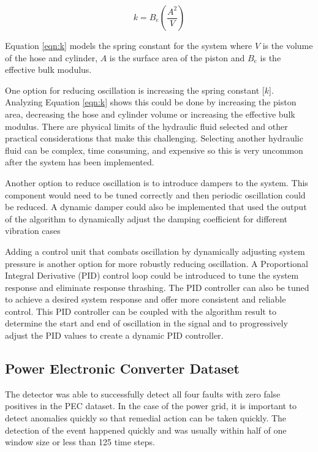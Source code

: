 \begin{equation}
    k = B_e \left ( \frac{A^2}{V} \right)
    \label{eqn:k}
\end{equation}

Equation \eqref{eqn:k} models the spring constant for the system where $V$ is the volume of the hose and cylinder, $A$ is the surface area of the piston and $B_e$ is the effective bulk modulus. 

One option for reducing oscillation is increasing the spring constant [$k$]. Analyzing Equation \eqref{eqn:k} shows this could be done by increasing the piston area, decreasing the hose and cylinder volume or increasing the effective bulk modulus. There are physical limits of the hydraulic fluid selected and other practical considerations that make this challenging. Selecting another hydraulic fluid can be complex, time consuming, and expensive so this is very uncommon after the system has been implemented. 

Another option to reduce oscillation is to introduce dampers to the system. This component would need to be tuned correctly and then periodic oscillation could be reduced. A dynamic damper could also be implemented that used the output of the algorithm to dynamically adjust the damping coefficient for different vibration cases 

Adding a control unit that combats oscillation by dynamically adjusting system pressure is another option for more robustly reducing oscillation. A Proportional Integral Derivative (PID) control loop could be introduced to tune the system response and eliminate response thrashing. The PID controller can also be tuned to achieve a desired system response and offer more consistent and reliable control. This PID controller can be coupled with the algorithm result to determine the start and end of oscillation in the signal and to progressively adjust the PID values to create a dynamic PID controller.


\subsection{Power Electronic Converter Dataset}
\label{ref_pec_discussion}

The detector was able to successfully detect all four faults with zero false positives in the PEC dataset. In the case of the power grid, it is important to detect anomalies quickly so that remedial action can be taken quickly. The detection of the event happened quickly and was usually within half of one window size or less than 125 time steps.

